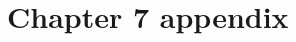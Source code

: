 \documentclass[a4paper,12pt,openany]{book}
\begin{document}
\appendix
\chapter{Chapter 7 appendix}

\end{document}

